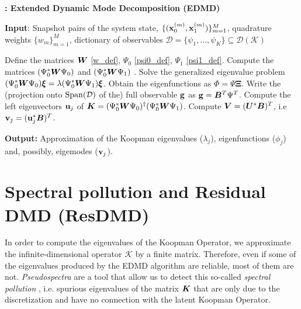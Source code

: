 \begin{algorithm}
\caption{\textbf{: Extended Dynamic Mode Decomposition (EDMD)}}
\label{alg_edmd}
\textbf{Input}: Snapshot pairs of the system state, $\{(\vb{x}_0^{(m)}, \vb{x}_1^{(m)})\}_{m = 1}^M$, quadrature weights $\{w_m\}_{m = 1}^M$, dictionary of observables $\mathcal{D} = \{\psi_1, \dots, \psi_K\} \subseteq \mathcal{D}(\mathcal{K})$
\begin{algorithmic}[1]
\State Define the matrices $\vb*{W}$ \eqref{w_def}, $\Psi_0$ \eqref{psi0_def}, $\Psi_1$ \eqref{psi1_def}. 
\State Compute the matrices $(\Psi_0^*\vb*{W}\Psi_0)$ and $(\Psi_0^*\vb*{W}\Psi_1)$ .
\State Solve the generalized eigenvalue problem $(\Psi_0^*\vb*{W}\Psi_0)\bm{\xi} = \lambda(\Psi_0^*\vb*{W}\Psi_1)\bm{\xi}$.
\State Obtain the eigenfunctions as $\Phi = \Psi\bm{\Xi}$.
    \State Write the (projection onto $\mathrm{Span}(\mathcal{D})$ of the) full observable $\vb{g}$ as $\vb{g} = \vb*{B}^T\Psi^T$.
    \State Compute the left eigenvectors $\vb{u}_j$ of $\vb*{K} = (\Psi_0^*\vb*{W}\Psi_0)^{\dagger}(\Psi_0^*\vb*{W}\Psi_1)$.
    \State Compute $\vb*{V} = (\vb*{U}^*\vb*{B})^T$, i.e $\vb{v}_j = (\vb{u}_j^*\vb*{B})^T$.
\EndIf
\end{algorithmic}
\textbf{Output:} Approximation of the Koopman eigenvalues ($\lambda_j$), eigenfunctions ($\phi_j$) and, possibly, eigemodes ($\vb{v}_j$).
\end{algorithm}


\section{Spectral pollution and Residual DMD (ResDMD)}
\label{section_resdmd}
In order to compute the eigenvalues of the Koopman Operator, we approximate the infinite-dimensional operator $\mathcal{K}$ by a finite matrix. Therefore, even if some of the eigenvalues produced by the EDMD algorithm are reliable, most of them are not. \emph{Pseudospectra} \cite{trefethen_spectra_2005} are a tool that allow us to detect this so-called \emph{spectral pollution} \cite{colbrook_rigorous_2021}, i.e. spurious eigenvalues of the matrix $\vb*{K}$ that are only due to the discretization and have no connection with the latent Koopman Operator.

